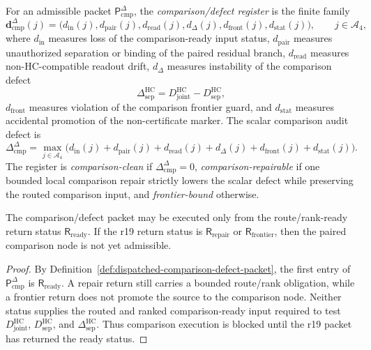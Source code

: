 \begin{definition}
\label{def:comparison-defect-register}
For an admissible packet \(\mathsf P_{\mathrm{cmp}}^{\Delta}\), the \emph{comparison/defect register} is the finite family
\[
  \mathbf d_{\mathrm{cmp}}^{\Delta}(j)
  =
  \bigl(d_{\mathrm{in}}(j),d_{\mathrm{pair}}(j),d_{\mathrm{read}}(j),d_{\Delta}(j),d_{\mathrm{front}}(j),d_{\mathrm{stat}}(j)\bigr),
  \qquad j\in\mathcal A_4,
\]
where \(d_{\mathrm{in}}\) measures loss of the comparison-ready input status, \(d_{\mathrm{pair}}\) measures unauthorized separation or binding of the paired residual branch, \(d_{\mathrm{read}}\) measures non-HC-compatible readout drift, \(d_{\Delta}\) measures instability of the comparison defect
\[
  \Delta_{\mathrm{sep}}^{\mathrm{HC}}
  =
  D_{\mathrm{joint}}^{\mathrm{HC}}-D_{\mathrm{sep}}^{\mathrm{HC}},
\]
\(d_{\mathrm{front}}\) measures violation of the comparison frontier guard, and \(d_{\mathrm{stat}}\) measures accidental promotion of the non-certificate marker.  The scalar comparison audit defect is
\[
  \Delta_{\mathrm{cmp}}^{\Delta}
  =
  \max_{j\in\mathcal A_4}
  \bigl(d_{\mathrm{in}}(j)+d_{\mathrm{pair}}(j)+d_{\mathrm{read}}(j)+d_{\Delta}(j)+d_{\mathrm{front}}(j)+d_{\mathrm{stat}}(j)\bigr).
\]
The register is \emph{comparison-clean} if \(\Delta_{\mathrm{cmp}}^{\Delta}=0\), \emph{comparison-repairable} if one bounded local comparison repair strictly lowers the scalar defect while preserving the routed comparison input, and \emph{frontier-bound} otherwise.
\end{definition}

\begin{lemma}
\label{lem:route-rank-ready-return-is-comparison-precondition}
The comparison/defect packet may be executed only from the route/rank-ready return status \(\mathsf R_{\mathrm{ready}}\).  If the r19 return status is \(\mathsf R_{\mathrm{repair}}\) or \(\mathsf R_{\mathrm{frontier}}\), then the paired comparison node is not yet admissible.
\end{lemma}

\begin{proof}
By Definition~\ref{def:dispatched-comparison-defect-packet}, the first entry of \(\mathsf P_{\mathrm{cmp}}^{\Delta}\) is \(\mathsf R_{\mathrm{ready}}\).  A repair return still carries a bounded route/rank obligation, while a frontier return does not promote the source to the comparison node.  Neither status supplies the routed and ranked comparison-ready input required to test \(D_{\mathrm{joint}}^{\mathrm{HC}}\), \(D_{\mathrm{sep}}^{\mathrm{HC}}\), and \(\Delta_{\mathrm{sep}}^{\mathrm{HC}}\).  Thus comparison execution is blocked until the r19 packet has returned the ready status.
\end{proof}

